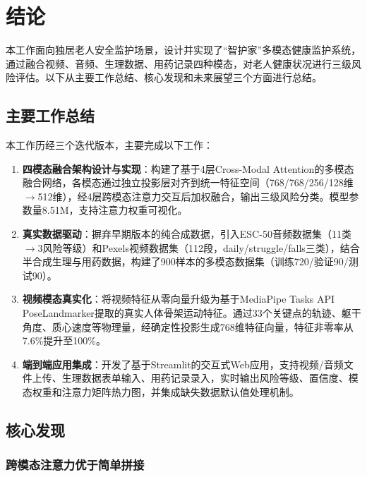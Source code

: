 \chapter{结论}
\label{chap:concl}

本工作面向独居老人安全监护场景，设计并实现了``智护家''多模态健康监护系统，通过融合视频、音频、生理数据、用药记录四种模态，对老人健康状况进行三级风险评估。以下从主要工作总结、核心发现和未来展望三个方面进行总结。

\section{主要工作总结}

本工作历经三个迭代版本，主要完成以下工作：

\begin{enumerate}
    \item \textbf{四模态融合架构设计与实现}：构建了基于4层Cross-Modal Attention的多模态融合网络，各模态通过独立投影层对齐到统一特征空间（768/768/256/128维$\to$512维），经4层跨模态注意力交互后加权融合，输出三级风险分类。模型参数量8.51M，支持注意力权重可视化。

    \item \textbf{真实数据驱动}：摒弃早期版本的纯合成数据，引入ESC-50音频数据集（11类$\to$3风险等级）和Pexels视频数据集（112段，daily/struggle/falls三类），结合半合成生理与用药数据，构建了900样本的多模态数据集（训练720/验证90/测试90）。

    \item \textbf{视频模态真实化}：将视频特征从零向量升级为基于MediaPipe Tasks API PoseLandmarker提取的真实人体骨架运动特征。通过33个关键点的轨迹、躯干角度、质心速度等物理量，经确定性投影生成768维特征向量，特征非零率从7.6\%提升至100\%。

    \item \textbf{端到端应用集成}：开发了基于Streamlit的交互式Web应用，支持视频/音频文件上传、生理数据表单输入、用药记录录入，实时输出风险等级、置信度、模态权重和注意力矩阵热力图，并集成缺失数据默认值处理机制。
\end{enumerate}

\section{核心发现}

\subsection{跨模态注意力优于简单拼接}

